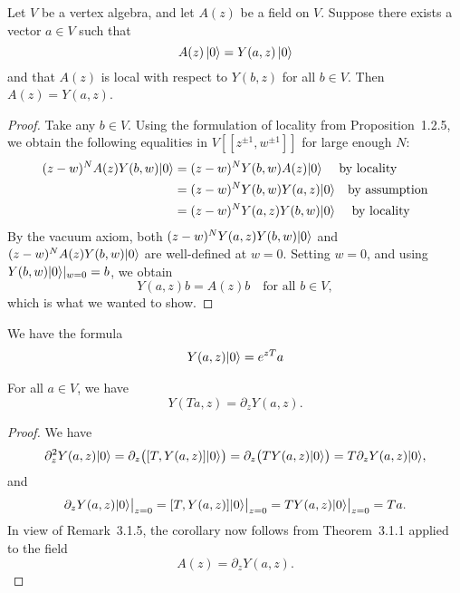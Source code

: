 \documentclass[12pt]{article}
\begin{document}
\begin{theorem}
    Let $V$ be a vertex algebra, and let $A(z)$ be a field on $V$.
    Suppose there exists a vector $a \in V$ such that
    \[
        A(z)\,\lvert 0 \rangle = Y(a,z)\,\lvert 0 \rangle
    \]
    and that $A(z)$ is local with respect to $Y(b,z)$ for all $b \in V$.
    Then $A(z) = Y(a,z)$.
\end{theorem}

\begin{proof}
    Take any $b \in V$.
    Using the formulation of locality from Proposition~1.2.5,
    we obtain the following equalities in $V[[z^{\pm1}, w^{\pm1}]]$ for large enough $N$:
    \begin{align*}
        (z-w)^N A(z)Y(b,w)\ket{0} & = (z-w)^N Y(b,w)A(z)\ket{0} \texty{ by locality}    \\
                                  & = (z-w)^N Y(b,w)Y(a,z)\ket{0} \texty{by assumption} \\
                                  & = (z-w)^N Y(a,z)Y(b,w)\ket{0} \texty{ by locality}
    \end{align*}
    By the vacuum axiom, both $(z-w)^N Y(a,z)Y(b,w)\lvert 0 \rangle$ and $(z-w)^N A(z)Y(b,w)\lvert 0 \rangle$
    are well-defined at $w=0$.
    Setting $w=0$, and using $Y(b,w)\lvert 0 \rangle|_{w=0} = b$, we obtain
    \[
        Y(a,z)b = A(z)b \quad \text{for all } b \in V,
    \]
    which is what we wanted to show.
\end{proof}
\begin{lemma}
    We have the formula \begin{align*}
        Y(a,z)\lvert 0 \rangle = e^{zT}a
    \end{align*}
\end{lemma}

\begin{corollary}
    For all $a \in V$, we have
    \[
        Y(Ta, z) = \partial_z Y(a, z).
    \]
\end{corollary}

\begin{proof}
    We have
    \[
        \partial_z^2 Y(a, z)\lvert 0 \rangle
        = \partial_z\big([T, Y(a, z)]\lvert 0 \rangle\big)
        = \partial_z\big(TY(a, z)\lvert 0 \rangle\big)
        = T\partial_z Y(a, z)\lvert 0 \rangle,
    \]
    and
    \[
        \partial_z Y(a, z)\lvert 0 \rangle\big|_{z=0}
        = [T, Y(a, z)]\lvert 0 \rangle\big|_{z=0}
        = TY(a, z)\lvert 0 \rangle\big|_{z=0}
        = Ta.
    \]
    In view of Remark~3.1.5, the corollary now follows from Theorem~3.1.1 applied to the field
    \[
        A(z) = \partial_z Y(a, z).
    \]
\end{proof}
\end{document}
